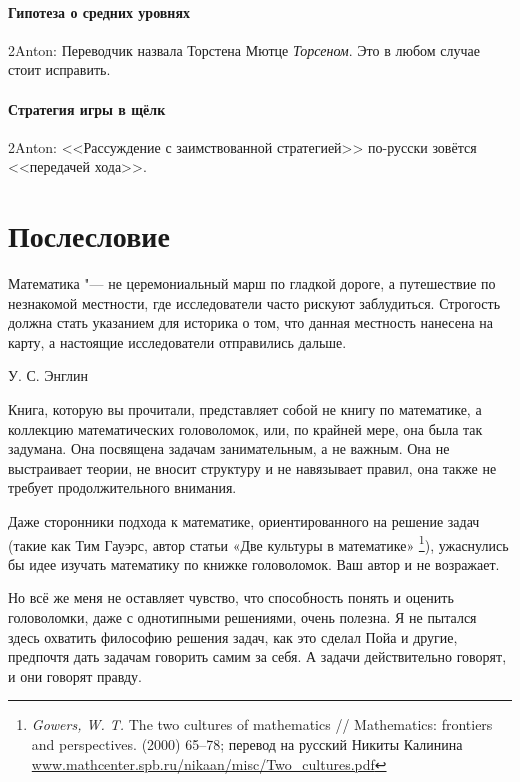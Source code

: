 \documentclass[twoside]{book}
\begin{document}
\subsubsection{Гипотеза о средних уровнях}
2Anton: Переводчик назвала Торстена Мютце \emph{Торсеном}. Это в любом случае стоит исправить.

\subsubsection{Стратегия игры в щёлк}
2Anton: <<Рассуждение с заимствованной стратегией>> по-русски зовётся <<передачей хода>>.



\chapter{Послесловие}

\setlength{\epigraphwidth}{.6\textwidth}
\epigraph{Математика "--- не церемониальный марш по гладкой дороге, а путешествие по незнакомой местности, где исследователи часто рискуют заблудиться.
Строгость должна стать указанием для историка о том, что данная местность нанесена на карту, а настоящие исследователи отправились дальше.\vspace{1ex}}{У. С. Энглин
}

Книга, которую  вы прочитали, представляет собой не книгу по математике, а коллекцию математических головоломок, или, по крайней мере, она была так задумана.
Она посвящена задачам занимательным, а не важным.
Она не выстраивает теории, не вносит структуру и не навязывает правил, она также не требует продолжительного внимания.

Даже сторонники подхода к математике, ориентированного на решение задач (такие как Тим Гауэрс, автор статьи «Две культуры в математике»%
\footnote{\emph{Gowers, W. T.} The two cultures of mathematics /\!/ {Mathematics: frontiers and per\-spec\-tives.} (2000) 65--78; перевод на русский  Никиты Калинина \href{http://www.mathcenter.spb.ru/nikaan/misc/Two_cultures.pdf}{\url{www.mathcenter.spb.ru/nikaan/misc/Two_cultures.pdf}}}),
ужаснулись бы идее изучать математику по книжке головоломок.
Ваш автор и не возражает.

Но всё же меня не оставляет чувство, что способность понять и оценить головоломки, даже с однотипными решениями, очень полезна.
Я не пытался здесь охватить  философию решения задач, как это сделал Пойа и другие, предпочтя дать задачам говорить самим за себя.
А задачи действительно говорят, и они говорят правду.
\end{document}

